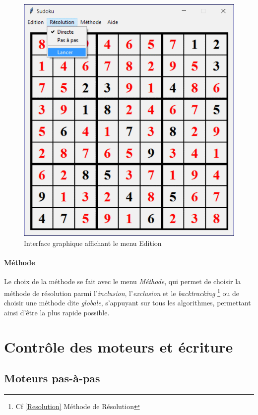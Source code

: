 \documentclass[12pt,a4paper]{report}
\begin{document}
\begin{figure}[!h]
 \center
 \includegraphics[scale=0.5]{../pictures/Sudoku_resolution}
 \caption{Interface graphique affichant le menu Edition}
\end{figure}

\paragraph{Méthode}Le choix de la méthode se fait avec le menu \emph{Méthode}, qui permet de choisir la méthode de résolution parmi l'\emph{inclusion}, l'\emph{exclusion }et le \emph{backtracking} \footnote{Cf \ref{Resolution} Méthode de Résolution} ou de choisir une méthode dite \emph{globale}, s'appuyant sur tous les algorithmes, permettant ainsi d'être la plus rapide possible.

\section{Contrôle des moteurs et écriture}
\subsection{Moteurs pas-à-pas}
\end{document}
